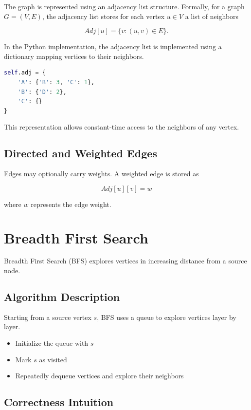 \documentclass[11pt]{article}
\begin{document}
The graph is represented using an adjacency list structure. Formally, for a
graph $G = (V,E)$, the adjacency list stores for each vertex $u \in V$ a list
of neighbors

\[
Adj[u] = \{v : (u,v) \in E\}.
\]

In the Python implementation, the adjacency list is implemented using a
dictionary mapping vertices to their neighbors.

\begin{lstlisting}[language=Python]
self.adj = {
    'A': {'B': 3, 'C': 1},
    'B': {'D': 2},
    'C': {}
}
\end{lstlisting}

This representation allows constant-time access to the neighbors of any
vertex.

\subsection{Directed and Weighted Edges}

Edges may optionally carry weights. A weighted edge is stored as

\[
Adj[u][v] = w
\]

where $w$ represents the edge weight.

\section{Breadth First Search}

Breadth First Search (BFS) explores vertices in increasing distance from a
source node.

\subsection{Algorithm Description}

Starting from a source vertex $s$, BFS uses a queue to explore vertices layer
by layer.

\begin{itemize}
\item Initialize the queue with $s$
\item Mark $s$ as visited
\item Repeatedly dequeue vertices and explore their neighbors
\end{itemize}

\subsection{Correctness Intuition}
\end{document}
